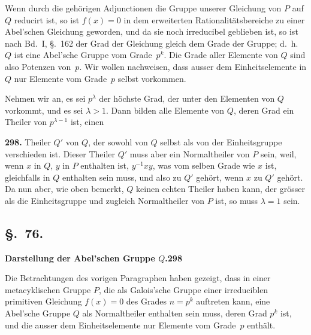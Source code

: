 \documentclass[12pt,a4paper]{article}
\begin{document}
Wenn durch die geh\"origen Adjunctionen die Gruppe unserer Gleichung von $P$ auf $Q$ reducirt ist, so ist $f(x)=0$ in dem erweiterten Rationalit\"atsbereiche zu einer Abel'schen Gleichung geworden, und da sie noch irreducibel geblieben ist, so ist nach Bd.~I, \S.~162 der Grad der Gleichung gleich dem Grade der Gruppe; d.~h.\ $Q$ ist eine Abel'sche Gruppe vom Grade~$p^k$. Die Grade aller Elemente von $Q$ sind also Potenzen von~$p$. Wir wollen nachweisen, dass ausser dem Einheitselemente in $Q$ nur Elemente vom Grade~$p$ selbst vorkommen.

Nehmen wir an, es sei $p^{\lambda}$ der h\"ochste Grad, der unter den Elementen von $Q$ vorkommt, und es sei $\lambda>1$. Dann bilden alle Elemente von $Q$, deren Grad ein Theiler von $p^{\lambda-1}$ ist, einen

\bigskip
\noindent\textbf{298.} Theiler $Q'$ von $Q$, der sowohl von $Q$ selbst als von der Einheitsgruppe verschieden ist. Dieser Theiler $Q'$ muss aber ein Normaltheiler von $P$ sein, weil, wenn $x$ in $Q$, $y$ in $P$ enthalten ist, $y^{-1}xy$, was vom selben Grade wie $x$ ist, gleichfalls in $Q$ enthalten sein muss, und also zu $Q'$ geh\"ort, wenn $x$ zu $Q'$ geh\"ort. Da nun aber, wie oben bemerkt, $Q$ keinen echten Theiler haben kann, der gr\"osser als die Einheitsgruppe und zugleich Normaltheiler von $P$ ist, so muss $\lambda=1$ sein.

\subsection*{\S.~76.}
\textbf{Darstellung der Abel'schen Gruppe $Q$.}\hfill\textbf{298}\\[4pt]

Die Betrachtungen des vorigen Paragraphen haben gezeigt, dass in einer metacyklischen Gruppe $P$, die als Galois'sche Gruppe einer irreduciblen primitiven Gleichung $f(x)=0$ des Grades $n=p^k$ auftreten kann, eine Abel'sche Gruppe $Q$ als Normaltheiler enthalten sein muss, deren Grad $p^k$ ist, und die ausser dem Einheitselemente nur Elemente vom Grade~$p$ enth\"alt.
\end{document}

